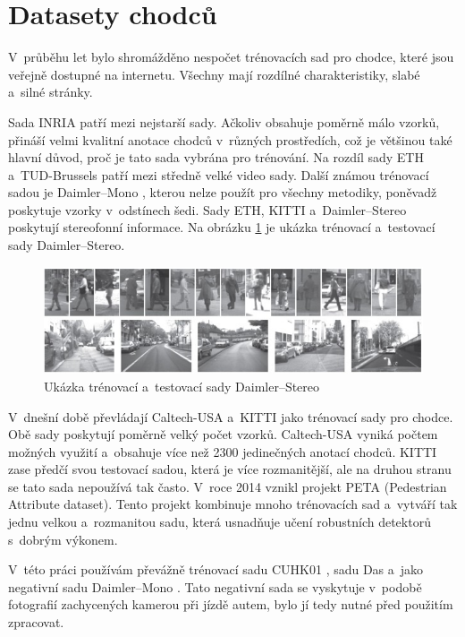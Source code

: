 \section{Datasety chodců} 
V~průběhu let bylo shromážděno nespočet trénovacích sad pro chodce, které jsou veřejně dostupné na internetu. Všechny mají rozdílné charakteristiky, slabé a~silné stránky. 

Sada INRIA \cite{inria} patří mezi nejstarší sady. Ačkoliv obsahuje poměrně málo vzorků, přináší velmi kvalitní anotace chodců v~různých prostředích, což je většinou také hlavní důvod, proč je tato sada vybrána pro trénování. Na rozdíl sady ETH \cite{eth} a~TUD-Brussels \cite{tudbrussels} patří mezi středně velké video sady. Další známou trénovací sadou je Daimler--Mono \cite{daimler}, kterou nelze použít pro všechny metodiky, poněvadž poskytuje vzorky v~odstínech šedi. Sady ETH, KITTI \cite{kitti} a~Daimler--Stereo \cite{daimlerstereo} poskytují stereofonní informace. Na obrázku \ref{fig:daimler_stereo} je ukázka trénovací a~testovací sady Daimler--Stereo. 

\begin{figure}[H]
\centering
\includegraphics[width=16cm]{figures/daimler_stereo}
\caption{Ukázka trénovací a~testovací sady Daimler--Stereo \cite{daimlerstereo}}
\label{fig:daimler_stereo}
\end{figure}

V~dnešní době převládají Caltech-USA \cite{caltech} a~KITTI jako trénovací sady pro chodce. Obě sady poskytují poměrně velký počet vzorků. Caltech-USA vyniká počtem možných využití a~obsahuje více než 2300 jedinečných anotací chodců. KITTI zase předčí svou testovací sadou, která je více rozmanitější, ale na druhou stranu se tato sada nepoužívá tak často. V~roce 2014 vznikl projekt PETA (Pedestrian Attribute dataset)\cite{peta}. Tento projekt kombinuje mnoho trénovacích sad a~vytváří tak jednu velkou a~rozmanitou sadu, která usnadňuje učení robustních detektorů s~dobrým výkonem.

V~této práci používám převážně trénovací sadu CUHK01 \cite{cuhk}, sadu Das \cite{sudipdas} a~jako negativní sadu Daimler--Mono \cite{daimler}. Tato negativní sada se vyskytuje v~podobě fotografií zachycených kamerou při jízdě autem, bylo jí tedy nutné před použitím zpracovat. 

